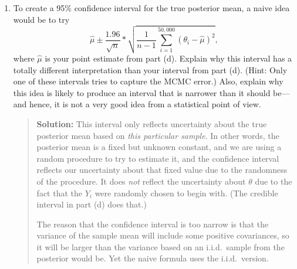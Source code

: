 \documentclass{article}
\begin{document}
\begin{enumerate}
\begin{enumerate}
      \item To create a 95\% confidence interval for the true posterior mean, a
      naive idea would be to try
      \[
      \hat\mu \pm \frac{1.96}{\sqrt{n}}*\sqrt{\frac1{n-1}\sum_{i=1}^{50{,}000} (\theta_i - \hat\mu)^2 },
      \]
      where $\hat\mu$ is your point estimate from part (d). Explain why this
      interval has a totally different interpretation than your interval from
      part (d). (Hint: Only one of these intervals tries to capture the MCMC
      error.) Also, explain why this idea is likely to produce an interval that
      is narrower than it should be---and hence, it is not a very good idea from
      a statistical point of view.
      \begin{quotation}{\bf Solution:}
      This interval only reflects uncertainty about the true posterior mean based on 
      {\em this particular sample}.  In other words, the posterior mean is a fixed but unknown
      constant, and we are using a random procedure to try to estimate it, and the confidence
      interval reflects our uncertainty about that fixed value due to the randomness of the procedure.
      It does {\em not} reflect the uncertainty about $\theta$ due to the fact that the $Y_i$
      were randomly chosen to begin with.   (The credible interval in part (d) does that.)
      
      The reason that the confidence interval is too narrow is that the variance of the sample
      mean will include some positive covariances, so it will be larger than the variance
      based on an i.i.d.~sample from the posterior would be.  Yet the naive formula uses
      the i.i.d.~version.
      \end{quotation}
      

\end{enumerate}
\end{enumerate}
\end{document}
